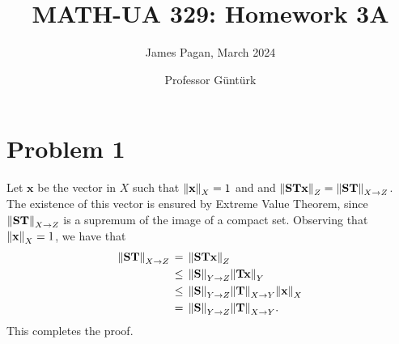 \documentclass[11pt]{article}
\title{MATH-UA 329: Homework 3A}
\author{James Pagan, March 2024}
\date{Professor Güntürk}
\renewcommand{\vec}[1]{\mathbf{#1}}
\newcommand{\mat}[1]{\mathbf{#1}}
\begin{document}
\maketitle
\tableofcontents
\newpage


\section{Problem 1}
 
Let $\vec{x}$ be the vector in $X$ such that $\norm{\vec{x}}_{X} = 1$ and and $\norm{\mat{ST} \vec{x}}_{Z} = \norm{\mat{ST}}_{X \to Z}$. The existence of this vector is ensured by Extreme Value Theorem, since $\norm{\mat{ST}}_{X \to Z}$ is a supremum of the image of a compact set. Observing that $\norm{\vec{x}}_{X} = 1$, we have that
\begin{align*}
  \norm{\mat{ST}}_{X \to Z} \, & = \, \norm{\mat{ST} \vec{x}}_{Z} \\
                               & \le \, \norm{\mat{S}}_{Y \to Z} \norm{\mat{Tx}}_{Y} \\
                               & \le \, \norm{\mat{S}}_{Y \to Z} \norm{\mat{T}}_{X \to Y} \norm{\vec{x}}_{X} \\
                               & = \, \norm{\mat{S}}_{Y \to Z} \norm{\mat{T}}_{X \to Y}.
\end{align*}
This completes the proof.

\end{document}
